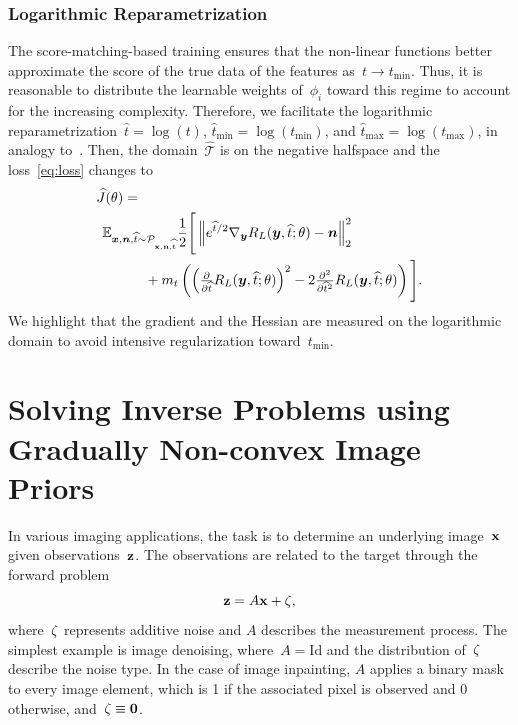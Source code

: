 \documentclass{article}
\newcommand{\T}{\mathcal{T}}
\newcommand{\id}{\mathrm{Id}}
\newcommand{\norm}[1]{\left\Vert#1\right\Vert}
\renewcommand{\vec}[1]{\mathbf{#1}}
\newcommand{\tmin}{t_\mathrm{min}}
\newcommand{\tmax}{t_\mathrm{max}}
\def\hatt{{\widehat{t}}}
\newcommand{\tminh}{\hatt_\mathrm{min}}
\newcommand{\tmaxh}{\hatt_\mathrm{max}}
\newcommand{\dist}[1]{\mathcal{P}_{#1}}
\theoremstyle{plain}
\theoremstyle{definition}
\theoremstyle{remark}
\begin{document}
\subsubsection{Logarithmic Reparametrization}
The score-matching-based training ensures that the non-linear functions better approximate the score of the true data of the features as~$t\to\tmin$.
Thus, it is reasonable to distribute the learnable weights of~$\phi_i$ toward this regime to account for the increasing complexity.
Therefore, we facilitate the logarithmic reparametrization~$\hatt=\log(t)$, $\tminh=\log(\tmin)$, and $\tmaxh=\log(\tmax)$, in analogy to~\citet{KaMi22}.
Then, the domain~$\widehat{\T}$ is on the negative halfspace and the loss~\eqref{eq:loss} changes to
\begin{align} \label{eq:losslog}
&\widehat{J}(\theta)=\\
&\hspace{1ex}\E_{\vx,\vn,\hatt\sim\dist{\rvx,\rvn,\widehat{\rt}}}\frac12\Bigg[\norm{e^{\hatt/2}\nabla_\vy R_L(\vy,\hatt;\theta) -\vn}_2^2 \notag\\
&\hspace{8ex}+ m_t\left(\left(\tfrac{\partial}{\partial\hatt}R_L(\vy,\hatt;\theta)\right)^2 -2\tfrac{\partial^2}{\partial \hatt^2}R_L(\vy,\hatt;\theta)\right)\Bigg]. \notag
\end{align}
We highlight that the gradient and the Hessian are measured on the logarithmic domain to avoid intensive regularization toward~$\tmin$.


\section{Solving Inverse Problems using Gradually Non-convex Image Priors}
In various imaging applications, the task is to determine an underlying image~${\mathbf{x}}$ given observations~${\mathbf{z}}$.
The observations are related to the target through the forward problem
\[
{\mathbf{z}} = A {\mathbf{x}} + {\mathbf{\zeta}},
\]
where~${\mathbf{\zeta}}$ represents additive noise and $A$ describes the measurement process.
The simplest example is image denoising, where~$A=\id$ and the distribution of~${\mathbf{\zeta}}$ describe the noise type.
In the case of image inpainting, $A$ applies a binary mask to every image element, which is 1 if the associated pixel is observed and 0 otherwise, and~$\rvzeta\equiv\vec{0}$.
\end{document}
